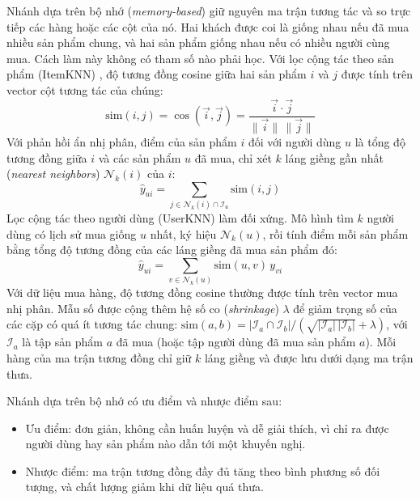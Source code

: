 Nhánh dựa trên bộ nhớ (\textit{memory-based}) giữ nguyên ma trận tương tác và so trực tiếp các hàng hoặc các cột của nó. Hai khách được coi là giống nhau nếu đã mua nhiều sản phẩm chung, và hai sản phẩm giống nhau nếu có nhiều người cùng mua. Cách làm này không có tham số nào phải học. Với lọc cộng tác theo sản phẩm (ItemKNN) \parencite{sarwar2001item}, độ tương đồng cosine giữa hai sản phẩm $i$ và $j$ được tính trên vector cột tương tác của chúng:
\begin{equation}
    \text{sim}(i, j) = \cos(\vec{i}, \vec{j}) = \frac{\vec{i} \cdot \vec{j}}{\lVert \vec{i} \rVert \, \lVert \vec{j} \rVert}
    \label{eq:cosine_sim}
\end{equation}
Với phản hồi ẩn nhị phân, điểm của sản phẩm $i$ đối với người dùng $u$ là tổng độ tương đồng giữa $i$ và các sản phẩm $u$ đã mua, chỉ xét $k$ láng giềng gần nhất (\textit{nearest neighbors}) $\mathcal{N}_k(i)$ của $i$:
\begin{equation}
    \hat{y}_{ui} = \sum_{j \in \mathcal{N}_k(i) \cap \mathcal{I}_u} \text{sim}(i, j)
    \label{eq:itemcf_predict}
\end{equation}
Lọc cộng tác theo người dùng (UserKNN) làm đối xứng. Mô hình tìm $k$ người dùng có lịch sử mua giống $u$ nhất, ký hiệu $\mathcal{N}_k(u)$, rồi tính điểm mỗi sản phẩm bằng tổng độ tương đồng của các láng giềng đã mua sản phẩm đó:
\begin{equation}
    \hat{y}_{ui} = \sum_{v \in \mathcal{N}_k(u)} \text{sim}(u, v)\, y_{vi}
    \label{eq:usercf_predict}
\end{equation}
Với dữ liệu mua hàng, độ tương đồng cosine thường được tính trên vector mua nhị phân. Mẫu số được cộng thêm hệ số co (\textit{shrinkage}) $\lambda$ để giảm trọng số của các cặp có quá ít tương tác chung: $\text{sim}(a, b) = |\mathcal{I}_a \cap \mathcal{I}_b| / (\sqrt{|\mathcal{I}_a|\,|\mathcal{I}_b|} + \lambda)$, với $\mathcal{I}_a$ là tập sản phẩm $a$ đã mua (hoặc tập người dùng đã mua sản phẩm $a$). Mỗi hàng của ma trận tương đồng chỉ giữ $k$ láng giềng và được lưu dưới dạng ma trận thưa.

Nhánh dựa trên bộ nhớ có ưu điểm và nhược điểm sau:
\begin{itemize}
    \item Ưu điểm: đơn giản, không cần huấn luyện và dễ giải thích, vì chỉ ra được người dùng hay sản phẩm nào dẫn tới một khuyến nghị.
    \item Nhược điểm: ma trận tương đồng đầy đủ tăng theo bình phương số đối tượng, và chất lượng giảm khi dữ liệu quá thưa.
\end{itemize}

